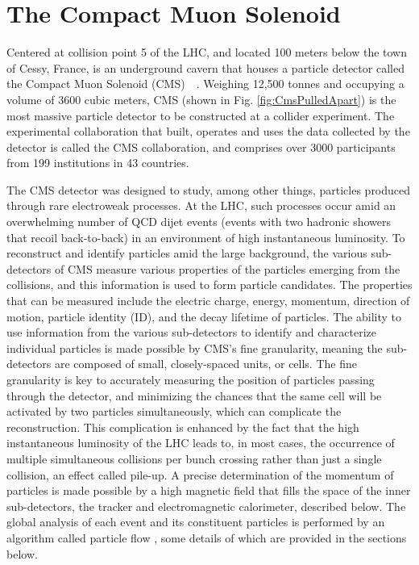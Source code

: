 \chapter{The Compact Muon Solenoid}
\label{chap:cms}
Centered at collision point 5 of the LHC, and located 100 meters below the town of Cessy, France, is an underground cavern that houses a particle detector called the Compact Muon Solenoid (CMS)~\cite{Breskin:1244506}~\cite{Chatrchyan:2008aa}. Weighing 12,500 tonnes and occupying a volume of 3600 cubic meters, CMS (shown in Fig. \ref{fig:CmsPulledApart}) is the most massive particle detector to be constructed at a collider experiment. The experimental collaboration that built, operates and uses the data collected by the detector is called the CMS collaboration, and comprises over 3000 participants from 199 institutions in 43 countries. 

The CMS detector was designed to study, among other things, particles produced through rare electroweak processes. At the LHC, such processes occur amid an overwhelming number of QCD dijet events (events with two  hadronic showers that recoil back-to-back) in an environment of high instantaneous luminosity. To reconstruct and identify particles amid the large background, the various sub-detectors of CMS measure various properties of the particles emerging from the collisions, and this information is used to form particle candidates. The properties that can be measured include the electric charge, energy, momentum, direction of motion, particle identity (ID), and the decay lifetime of particles. The ability to use information from the various sub-detectors to identify and characterize individual particles is made possible by CMS's fine granularity, meaning the sub-detectors are composed of small, closely-spaced units, or cells. The fine granularity is key to accurately measuring the position of particles passing through the detector, and minimizing the chances that the same cell will be activated by two particles simultaneously, which can complicate the reconstruction. This complication is enhanced by the fact that the high instantaneous luminosity of the LHC leads to, in most cases, the occurrence of multiple simultaneous collisions per bunch crossing rather than just a single collision, an effect called pile-up. A precise determination of the momentum of particles is made possible by a high magnetic field that fills the space of the inner sub-detectors, the tracker and electromagnetic calorimeter, described below. The global analysis of each event and its constituent particles is performed by an algorithm called particle flow \cite{Beaudette:2014cea}, some details of which are provided in the sections below.

